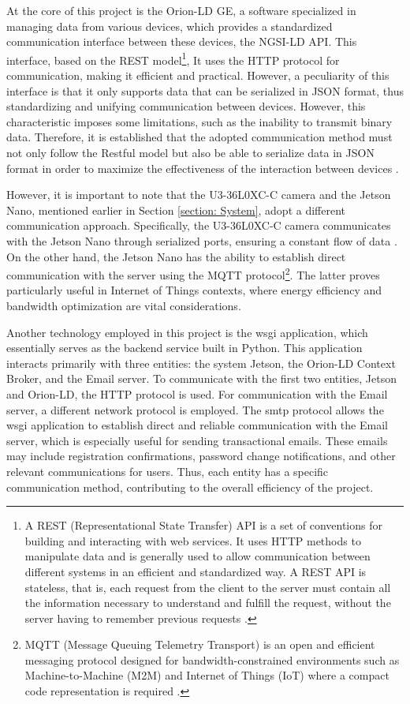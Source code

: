 At the core of this project is the Orion-LD GE, a software specialized in managing data from various devices, which provides a standardized communication interface between these devices, the NGSI-LD API. This interface, based on the REST model\footnote{A REST (Representational State Transfer) API is a set of conventions for building and interacting with web services. It uses HTTP methods to manipulate data and is generally used to allow communication between different systems in an efficient and standardized way. A REST API is stateless, that is, each request from the client to the server must contain all the information necessary to understand and fulfill the request, without the server having to remember previous requests \cite{Mark2011}.}, It uses the HTTP protocol for communication, making it efficient and practical. However, a peculiarity of this interface is that it only supports data that can be serialized in JSON format, thus standardizing and unifying communication between devices. However, this characteristic imposes some limitations, such as the inability to transmit binary data. Therefore, it is established that the adopted communication method must not only follow the Restful model but also be able to serialize data in JSON format in order to maximize the effectiveness of the interaction between devices \cite{etsi2023}.

However, it is important to note that the U3-36L0XC-C camera and the Jetson Nano, mentioned earlier in Section \ref{section: System}, adopt a different communication approach. Specifically, the U3-36L0XC-C camera communicates with the Jetson Nano through serialized ports, ensuring a constant flow of data \cite{ids_imaging_development_systemsu3-36l0xc_2023}. On the other hand, the Jetson Nano has the ability to establish direct communication with the server using the MQTT protocol\footnote{MQTT (Message Queuing Telemetry Transport) is an open and efficient messaging protocol designed for bandwidth-constrained environments such as Machine-to-Machine (M2M) and Internet of Things (IoT) where a compact code representation is required \cite{banks2019mqtt}.}. The latter proves particularly useful in Internet of Things contexts, where energy efficiency and bandwidth optimization are vital considerations.


Another technology employed in this project is the \acrfull{wsgi} application, which essentially serves as the backend service built in Python. This application interacts primarily with three entities: the  system Jetson, the Orion-LD Context Broker, and the Email server. To communicate with the first two entities, Jetson and Orion-LD, the HTTP protocol is used. For communication with the Email server, a different network protocol is employed. The \acrfull{smtp} protocol allows the \acrfull{wsgi} application to establish direct and reliable communication with the Email server, which is especially useful for sending transactional emails. These emails may include registration confirmations, password change notifications, and other relevant communications for users. Thus, each entity has a specific communication method, contributing to the overall efficiency of the project.


